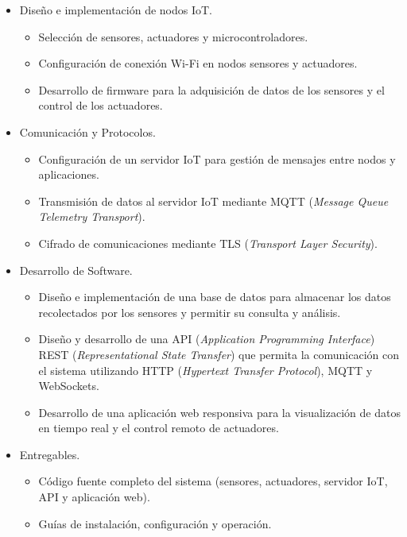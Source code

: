 \begin{itemize}
      \item Diseño e implementación de nodos IoT.
            \begin{itemize}
                  \item Selección de sensores, actuadores y microcontroladores.
                  \item Configuración de conexión Wi-Fi en nodos sensores y actuadores.
                  \item Desarrollo de firmware para la adquisición de datos de los sensores y el
                        control de los actuadores.
            \end{itemize}
\end{itemize}
\begin{itemize}
      \item Comunicación y Protocolos.
            \begin{itemize}
                  \item Configuración de un servidor IoT para gestión de mensajes entre nodos y
                        aplicaciones.
                  \item Transmisión de datos al servidor IoT mediante MQTT (\textit{Message Queue
                              Telemetry Transport}).
                  \item Cifrado de comunicaciones mediante TLS (\textit{Transport Layer Security}).
            \end{itemize}
\end{itemize}
\begin{itemize}
      \item Desarrollo de Software.
            \begin{itemize}
                  \item Diseño e implementación de una base de datos para almacenar los datos
                        recolectados por los sensores y permitir su consulta y análisis.
                  \item Diseño y desarrollo de una API (\textit{Application Programming Interface})
                        REST (\textit{Representational State Transfer}) que permita la comunicación con
                        el sistema utilizando HTTP (\textit{Hypertext Transfer Protocol}), MQTT y
                        WebSockets.
                  \item Desarrollo de una aplicación web responsiva para la visualización de datos en
                        tiempo real y el control remoto de actuadores.
            \end{itemize}
\end{itemize}
\begin{itemize}
      \item Entregables.
            \begin{itemize}
                  \item Código fuente completo del sistema (sensores, actuadores, servidor IoT, API y
                        aplicación web).
                  \item Guías de instalación, configuración y operación.
            \end{itemize}
\end{itemize}

